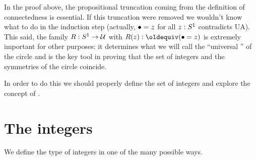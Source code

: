 In the proof above, the propositional truncation coming 
from the definition of connectedness is essential.
If this truncation were removed we wouldn't know what to do in
the induction step (actually, ${\bullet=z}$ for all $z:S^1$ contradicts UA).
This said, the family $R:S^1\to\mathcal{U}$ with $R(z)\defequi (\base=z)$ is extremely 
important for other purposes: it determines what we will call the 
``universal \covering'' of the circle and is the key tool in proving that 
the set of integers and the symmetries of the circle coincide.

In order to do this we should properly define the set of integers 
and explore the concept of \coverings.

\section{The integers}
\label{sec:integers}

We define the type of integers in one of the many possible ways.


